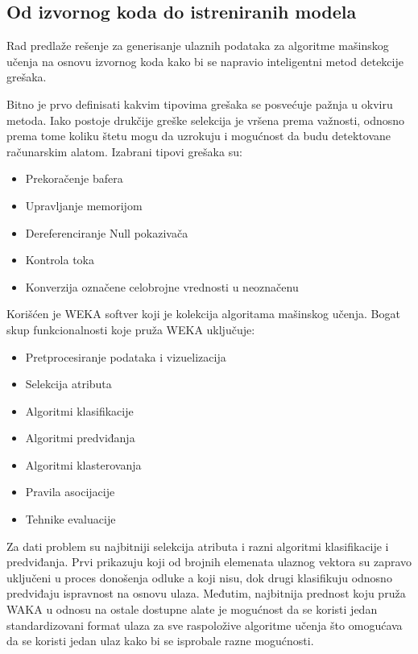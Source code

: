 \documentclass[a4paper]{article}
\theoremstyle{definition}
\begin{document}
{\subsection{Od izvornog koda do istreniranih modela}
\label{subsec:pregled}

Rad \cite{staticFeatures} predlaže rešenje za generisanje ulaznih podataka za algoritme mašinskog učenja na osnovu
izvornog koda kako bi se napravio inteligentni metod detekcije grešaka.

Bitno je prvo definisati kakvim tipovima grešaka se posvećuje pažnja u okviru metoda.
Iako postoje drukčije greške selekcija je vršena prema važnosti, odnosno prema tome
koliku štetu mogu da uzrokuju i mogućnost da budu detektovane računarskim alatom. Izabrani tipovi grešaka su:

\begin{itemize}
\item Prekoračenje bafera

\item Upravljanje memorijom

\item Dereferenciranje Null pokazivača

\item Kontrola toka

\item Konverzija označene celobrojne vrednosti u neoznačenu
\end{itemize}


Korišćen je WEKA softver koji je kolekcija algoritama mašinskog učenja.
Bogat skup funkcionalnosti koje pruža WEKA uključuje:
\begin{itemize}
\item Pretprocesiranje podataka i vizuelizacija
\item Selekcija atributa
\item Algoritmi klasifikacije
\item Algoritmi predviđanja
\item Algoritmi klasterovanja
\item Pravila asocijacije
\item Tehnike evaluacije
\end{itemize}


Za dati problem su najbitniji selekcija atributa i razni algoritmi klasifikacije i predviđanja.
Prvi prikazuju koji od brojnih elemenata ulaznog vektora su zapravo uključeni u proces donošenja odluke a koji nisu, dok
drugi klasifikuju odnosno predviđaju ispravnost na osnovu ulaza.
Međutim, najbitnija prednost koju pruža WAKA u odnosu na ostale dostupne alate je mogućnost da se koristi
jedan standardizovani format ulaza za sve raspoložive algoritme učenja što omogućava da se koristi jedan ulaz kako bi se isprobale
razne mogućnosti.

}
\end{document}

